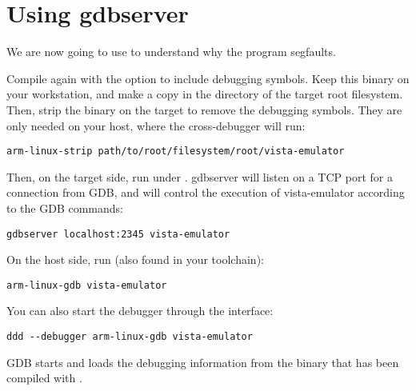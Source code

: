 


\section{Using gdbserver}

We are now going to use  to understand why the program
segfaults.

Compile  again with the  option to
include debugging symbols. Keep this binary on your workstation, and
make a copy in the  directory of the target root
filesystem. Then, strip the binary on the target to remove the
debugging symbols. They are only needed on your host, where the
cross-debugger will run:

\begin{verbatim}
arm-linux-strip path/to/root/filesystem/root/vista-emulator
\end{verbatim}

Then, on the target side, run  under
. gdbserver will listen on a TCP port for a connection
from GDB, and will control the execution of vista-emulator according
to the GDB commands:

\begin{verbatim}
gdbserver localhost:2345 vista-emulator
\end{verbatim}

On the host side, run  (also found in your toolchain):
\begin{verbatim}
arm-linux-gdb vista-emulator
\end{verbatim}

You can also start the debugger through the  interface:
\begin{verbatim}
ddd --debugger arm-linux-gdb vista-emulator
\end{verbatim}

GDB starts and loads the debugging information from the
 binary that has been compiled with .

